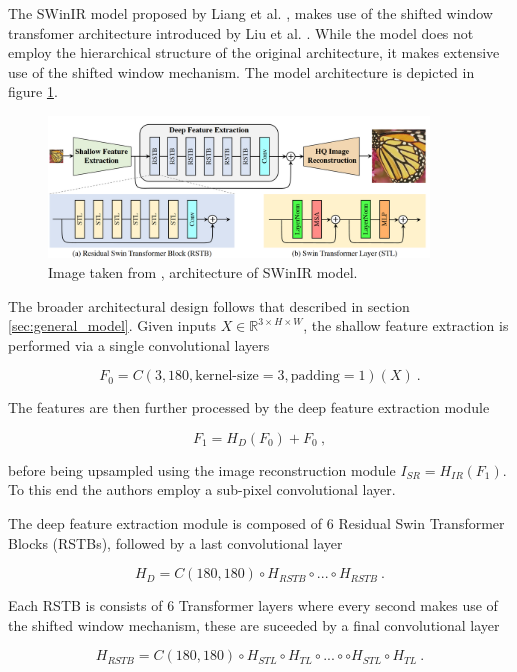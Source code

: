 The SWinIR model proposed by Liang et al. \cite{liangSwinIRImageRestoration2021a}, 
makes use of the shifted window transfomer architecture introduced by Liu et al. \cite{liangSwinIRImageRestoration2021a}.
While the model does not employ the hierarchical structure of the original architecture, 
it makes extensive use of the shifted window mechanism.
The model architecture is depicted in figure \ref{fig:swinir_model}.

\begin{figure}[h!]
    \includegraphics[width=0.9\textwidth]{models/sisr/imgs/swinir_model.png}
    \caption{Image taken from \cite{liangSwinIRImageRestoration2021a}, architecture of SWinIR model.}
    \label{fig:swinir_model}
\end{figure}

The broader architectural design follows that described in section \ref{sec:general_model}.
Given inputs $X \in \mathbb R^{3 \times H \times W}$, 
the shallow feature extraction is performed via a single convolutional layers

    $$F_0 = C(3, 180, \text{kernel-size}=3, \text{padding}=1)(X) ~.$$

The features are then further processed by the deep feature extraction module

    $$F_1 = H_D(F_0) + F_0 ~,$$

before being upsampled using the image reconstruction module $I_{SR} = H_{IR}(F_1)$.
To this end the authors employ a sub-pixel convolutional layer. \newline

The deep feature extraction module is composed of $6$ Residual Swin Transformer Blocks (RSTBs),
followed by a last convolutional layer

    $$H_D = C(180, 180) \circ H_{RSTB} \circ ... \circ H_{RSTB} ~.$$

Each RSTB is consists of $6$ Transformer layers where every second makes use of the shifted window mechanism, 
these are suceeded by a final convolutional layer

    $$H_{RSTB} = C(180, 180) \circ H_{STL} \circ H_{TL} \circ ... \circ \circ H_{STL} \circ H_{TL} ~.$$


